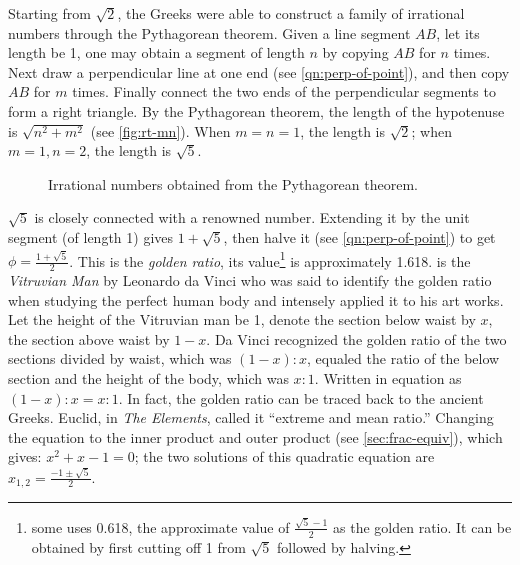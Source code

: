 \documentclass[b5paper]{article}
\begin{document}
Starting from $\sqrt{2}$, the Greeks were able to construct a family of irrational numbers through the Pythagorean theorem. Given a line segment $AB$, let its length be 1, one may obtain a segment of length $n$ by copying $AB$ for $n$ times. Next draw a perpendicular line at one end (see \cref{qn:perp-of-point}), and then copy $AB$ for $m$ times. Finally connect the two ends of the perpendicular segments to form a right triangle. By the Pythagorean theorem, the length of the hypotenuse is $\sqrt{n^2 + m^2}$ (see \cref{fig:rt-mn}). When $m = n = 1$, the length is $\sqrt{2}$; when $m=1, n=2$, the length is $\sqrt{5}$.

\begin{figure}[htbp]
  \centering
  \quad
  \caption{Irrational numbers obtained from the Pythagorean theorem.}
  \label{fig:irrational-tagent}
\end{figure}

$\sqrt{5}$ is closely connected with a renowned number. Extending it by the unit segment (of length 1) gives $1 + \sqrt{5}$, then halve it (see \cref{qn:perp-of-point}) to get $\phi = \frac{1 + \sqrt{5}}{2}$. This is the \emph{golden ratio}, its value\footnote{some uses 0.618, the approximate value of $\frac{\sqrt{5} - 1}{2}$ as the golden ratio. It can be obtained by first cutting off 1 from $\sqrt{5}$ followed by halving.} is approximately 1.618.  is the \emph{Vitruvian Man} by Leonardo da Vinci who was said to identify the golden ratio when studying the perfect human body and intensely applied it to his art works. Let the height of the Vitruvian man be 1, denote the section below waist by $x$, the section above waist by $1 - x$. Da Vinci recognized the golden ratio of the two sections divided by waist, which was $(1 - x) : x$, equaled the ratio of the below section and the height of the body, which was $x : 1$. Written in equation as $(1 - x) : x = x : 1$. In fact, the golden ratio can be traced back to the ancient Greeks. Euclid, in \emph{The Elements}, called it \enquote{extreme and mean ratio.} Changing the equation to the inner product and outer product (see \cref{sec:frac-equiv}), which gives: $x^2 + x - 1 = 0$; the two solutions of this quadratic equation are $x_{1, 2} = \frac{-1 \pm \sqrt{5}}{2}$.
\end{document}
